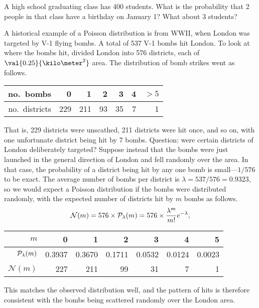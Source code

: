 \begin{exercisebox}
A high school graduating class has 400 students.  What is the probability that 2 people in that class have a birthday on January 1?  What about 3 students?
\end{exercisebox}

A historical example of a Poisson distribution is from WWII, when London was targeted by V-1 flying bombs.  A total of 537 V-1 bombs hit London.  To look at where the bombs hit,  divided London into 576 districts, each of $\val{0.25}{\kilo\meter^{2}}$ area.  The distribution of bomb strikes went as follows.
\begin{center}
\begin{tabular}{r|rrrrrr}
no.\ bombs & 0 & 1 & 2 & 3 & 4 & $>5$\\
\hline
no.\ districts & 229 & 211 & 93 & 35 & 7 & 1\\
\end{tabular}
\end{center}
That is, 229 districts were unscathed, 211 districts were hit once, and so on, with one unfortunate district being hit by 7 bombs.  Question: were certain districts of London deliberately targeted? Suppose instead that the bombs were just launched in the general direction of London and fell randomly over the area.  In that case, the probability of a district being hit by any one bomb is small---$1/576$ to be exact.  The average number of bombs per district is $\lambda = 537/576 = 0.9323$, so we would expect a Poisson distribution if the bombs were distributed randomly, with the expected number of districts hit by $m$ bombs as follows.
\[ \mathcal{N}(m) = 576\times \mathcal{P}_{\lambda}(m) = 576\times \frac{\lambda^{m}}{m!}e^{-\lambda}, \]
\begin{center}
\begin{tabular}{r|rrrrrr}
$m$ & 0 & 1 & 2 & 3 & 4 & 5\\
\hline
$\mathcal{P}_{\lambda}(m)$ & 0.3937 & 0.3670 & 0.1711 & 0.0532 & 0.0124 & 0.0023\\
$\mathcal{N}(m)$ & 227 & 211 & 99 & 31 & 7 & 1
\end{tabular}
\end{center}
This matches the observed distribution well, and the pattern of hits is therefore consistent with the bombs being scattered randomly over the London area.

